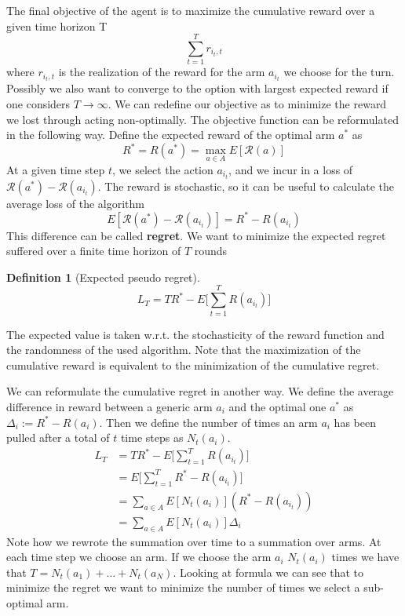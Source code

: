 \documentclass[main.tex]{subfiles}
\newtheorem{definition}{Definition}[section]
\begin{document}
The final objective of the agent is to maximize the cumulative reward over a
given time horizon T
\begin{equation*}
    \sum_{t=1}^T r_{{i_t},t}
\end{equation*}
where $r_{{i_t},t}$ is the realization of the reward for the arm $a_{i_t}$ we choose for the turn. Possibly we also want to converge to the option with largest expected reward if one considers $T \rightarrow \infty$. We can redefine our objective as to minimize the reward we lost through acting non-optimally. The objective function can be reformulated in the following way. Define the expected reward of the optimal arm $a^*$ as
\begin{equation*}
    R^* = R(a^*) = \max_{a \in A} E[\mathcal{R}(a)]
\end{equation*}
At a given time step $t$, we select the action $a_{i_t}$, and we incur in a loss of $\mathcal{R}(a^*) - \mathcal{R}(a_{i_t})$. The reward is stochastic, so it can be useful to calculate the average loss of the algorithm
\begin{equation*}
    E[\mathcal{R}(a^*) - \mathcal{R}(a_{i_t})] = R^* - R(a_{i_t})
\end{equation*}
This difference can be called \textbf{regret}.
We want to minimize the expected regret suffered over a finite time horizon of $T$ rounds
\begin{definition}[Expected pseudo regret]
\begin{equation*}
    L_T = TR^* - E \bigg[ \sum_{t=1}^T R(a_{i_t}) \bigg]
\end{equation*}
\end{definition}
\par \noindent
The expected value is taken w.r.t. the stochasticity of the reward function and the randomness of the used algorithm. Note that the maximization of the cumulative reward is equivalent to the minimization of the cumulative regret.

We can reformulate the cumulative regret in another way.
We define the average difference in reward between a generic arm $a_i$ and the optimal one $a^*$ as $\Delta_i := R^*-R(a_i)$. Then we define the number of times an arm $a_i$ has been pulled after a total of $t$ time steps as $N_t(a_i)$.
\begin{align*}
    L_T &= TR^* - E \bigg[ \sum_{t=1}^T R(a_{i_t}) \bigg] \\
    &= E \bigg[ \sum_{t=1}^T R^* - R(a_{i_t}) \bigg] \\
    &= \sum_{a \in A} E[N_t(a_i)](R^* - R(a_{i_t})) \\
    &= \sum_{a \in A} E[N_t(a_i)] \Delta_i
\end{align*}
Note how we rewrote the summation over time to a summation over arms. At each time step we choose an arm. If we choose the arm $a_i$ $N_t(a_i)$ times we have that $T= N_t(a_1) + \dots + N_t(a_N)$. Looking at formula we can see that to minimize the regret we want to minimize the number of times we select a sub-optimal arm.
\end{document}
